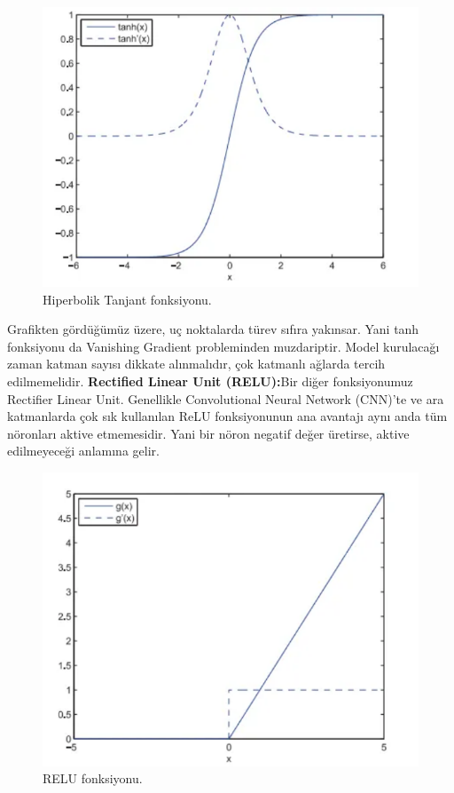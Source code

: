 \documentclass[12pt, a4paper]{article}
\begin{document}
	\begin{figure}[!h]
		\centering
		\includegraphics{6.4.png}
		\caption{Hiperbolik Tanjant fonksiyonu.}
	\end{figure}\newpage
	Grafikten gördüğümüz üzere, uç noktalarda türev sıfıra yakınsar. Yani tanh fonksiyonu da Vanishing Gradient probleminden muzdariptir. Model kurulacağı zaman katman sayısı dikkate alınmalıdır, çok katmanlı ağlarda tercih edilmemelidir.
	\newline \textbf{ Rectified Linear Unit (RELU):}Bir diğer fonksiyonumuz Rectifier Linear Unit. Genellikle Convolutional Neural Network (CNN)’te ve ara katmanlarda çok sık kullanılan ReLU fonksiyonunun ana avantajı aynı anda tüm nöronları aktive etmemesidir. Yani bir nöron negatif değer üretirse, aktive edilmeyeceği anlamına gelir.
	\begin{figure}[!h]
		\centering
		\includegraphics{6.5.png}
		\caption{RELU fonksiyonu.}
	\end{figure}
\end{document}
